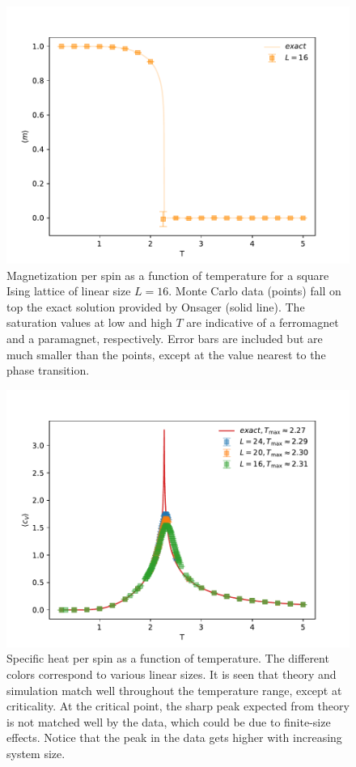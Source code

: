\documentclass[12pt]{article}
\begin{document}
\begin{figure}[h]
\begin{center}
\includegraphics[width=0.7\columnwidth]{Figures/b_m_per_spin}
\end{center}
\caption{Magnetization per spin as a function of temperature for a square Ising lattice of linear size $L=16$. Monte Carlo data (points) fall on top the exact solution provided by Onsager (solid line). The saturation values at low and high $T$ are indicative of a ferromagnet and a paramagnet, respectively. Error bars are included but are much smaller than the points, except at the value nearest to the phase transition.}
\label{fig:internal_magnetization}
\end{figure}

\begin{figure}[h]
\begin{center}
\includegraphics[width=0.7\columnwidth]{Figures/c_specific_heat}
\end{center}
\caption{Specific heat per spin as a function of temperature. The different colors correspond to various linear sizes. It is seen that theory and simulation match well throughout the temperature range, except at criticality. At the critical point, the sharp peak expected from theory is not matched well by the data, which could be due to finite-size effects. Notice that the peak in the data gets higher with increasing system size.}
\label{fig:cv_vs_T}
\end{figure}
\end{document}
